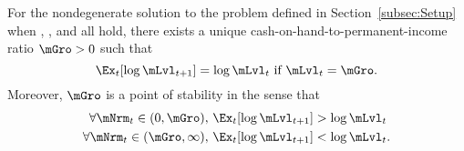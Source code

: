  \begin{theorem}\label{thm:TheoremGroIsStable}
    For the nondegenerate solution to the problem defined in Section~\ref{subsec:Setup} when {\FVAC}, {\WRIC}, and {\GICLog} all hold, there exists a unique cash-on-hand-to-permanent-income ratio $\mGro>0$ such that
    \begin{equation}
      \Ex_t [\log {\mLvl}_{t+1} ] = \log \mLvl_t \mbox{~if~} \mLvl_t = \mGro.
      \label{eq:mTarget}
    \end{equation}
    Moreover, $\mGro$ is a point of stability in the sense that
    \begin{equation} \label{eq:stability}
      \begin{split}
        \forall {\mNrm}_t\in(0,\mGro),      \,\,& \Ex_t [\log {\mLvl}_{t+1}] > \log {\mLvl}_t  \\
        \forall {\mNrm}_t\in(\mGro,\infty), \,\,& \Ex_t [\log {\mLvl}_{t+1}] < \log {\mLvl}_t.
      \end{split}
    \end{equation}
  \end{theorem}

